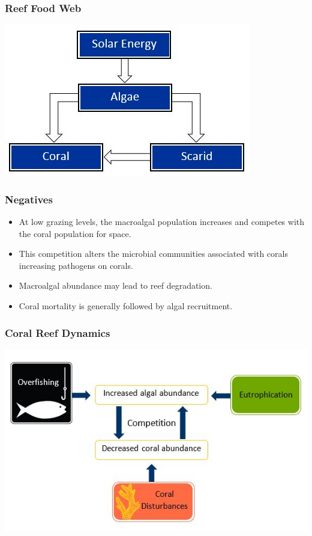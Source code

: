 \begin{frame}
\centering
\frametitle{Reef Food Web}
\includegraphics[scale=.65]{./CoralFoodWeb}
\end{frame}

\begin{frame}
\frametitle{Negatives}
\begin{itemize}
\item At low grazing levels, the macroalgal population increases and competes with the coral population for space.
\item This competition alters the microbial communities associated with corals increasing pathogens on corals.
\item Macroalgal abundance may lead to reef degradation.
\item Coral mortality is generally followed by algal recruitment.
\end{itemize}
\end{frame}

\begin{frame}
\frametitle{Coral Reef Dynamics}
\includegraphics[scale=.7]{./CoralDynamics}
\end{frame}

